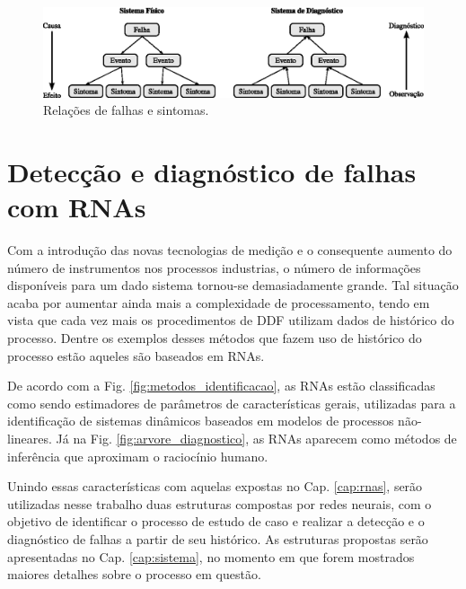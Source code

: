 \begin{figure}[htb]
\centering
    \includegraphics[width=\textwidth]{imgs/detec_diag/eps/falha_sintoma}
    \caption{Relações de falhas e sintomas.}
    \label{fig:falha_sintoma}
\end{figure}

\section{Detecção e diagnóstico de falhas com RNAs}
Com a introdução das novas tecnologias de medição e o consequente aumento do
número de instrumentos nos processos industrias, o número de informações
disponíveis para um dado sistema tornou-se demasiadamente grande. Tal situação
acaba por aumentar ainda mais a complexidade de processamento, tendo em vista
que cada vez mais os procedimentos de DDF utilizam dados de histórico do
processo. Dentre os exemplos desses métodos que fazem uso de histórico do
processo estão aqueles são baseados em RNAs.

De acordo com a Fig. \ref{fig:metodos_identificacao}, as RNAs estão
classificadas como sendo estimadores de parâmetros de características gerais,
utilizadas para a identificação de sistemas dinâmicos baseados em modelos de
processos não-lineares. Já na Fig. \ref{fig:arvore_diagnostico}, as RNAs
aparecem como métodos de inferência que aproximam o raciocínio humano.

Unindo essas características com aquelas expostas no Cap. \ref{cap:rnas}, serão
utilizadas nesse trabalho duas estruturas compostas por redes neurais, com o
objetivo de identificar o processo de estudo de caso e realizar a detecção e o
diagnóstico de falhas a partir de seu histórico. As estruturas propostas serão
apresentadas no Cap. \ref{cap:sistema}, no momento em que forem mostrados
maiores detalhes sobre o processo em questão.
